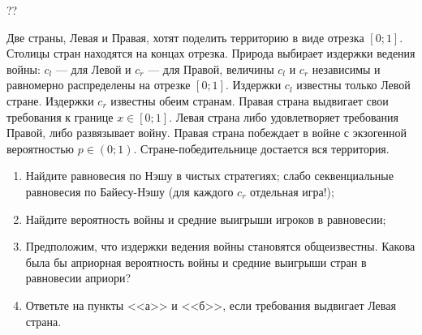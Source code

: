 \begin{problem}\par
\begin{source} \cite{slanthcev:gt}?? \end{source}
Две страны, Левая и Правая, хотят поделить территорию в виде отрезка  $\left[0;1\right]$. Столицы стран находятся на концах отрезка. Природа выбирает издержки ведения войны:  $c_{l} $  --- для Левой и  $c_{r} $  --- для Правой, величины  $c_{l} $  и  $c_{r} $  независимы и равномерно распределены на отрезке  $\left[0;1\right]$. Издержки  $c_{l} $  известны только Левой стране. Издержки  $c_{r} $  известны обеим странам. Правая страна выдвигает свои требования к границе  $x\in \left[0;1\right]$. Левая страна либо удовлетворяет требования Правой, либо развязывает войну. Правая страна побеждает в войне с экзогенной вероятностью  $p\in \left(0;1\right)$. Стране-победительнице достается вся территория.\par
\begin{enumerate}
\item      Найдите равновесия по Нэшу в чистых стратегиях; слабо секвенциальные равновесия по Байесу-Нэшу ({\red для каждого $c_r$ отдельная игра!});\par
\item      Найдите вероятность войны и средние выигрыши игроков в равновесии;\par
\item       Предположим, что издержки ведения войны становятся общеизвестны. Какова была бы {\red априорная} вероятность войны и средние выигрыши стран в равновесии {\red априори}? \par
\item      Ответьте на пункты <<а>> и <<б>>, если требования выдвигает Левая страна.
\end{enumerate}


\begin{sol}

\end{sol}
\end{problem}



